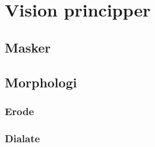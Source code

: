 \chapter{Vision principper}\label{app:VisionPrincipper}

\section{Masker}\label{sec:Masker}

\section{Morphologi}\label{sec:Morphologi}
\subsection{Erode}
\subsection{Dialate}

